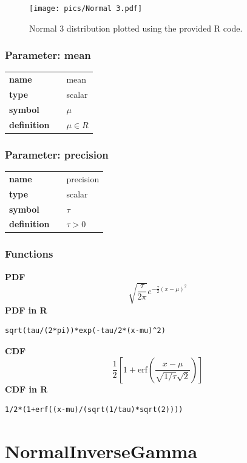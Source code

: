\documentclass{article}
\begin{document}
\begin{figure}[ht!]
\centering
  \texttt{[image: pics/Normal 3.pdf]}
 \caption{Normal 3 distribution plotted using the provided R code.}
 \label{fig:Normal 3}
\end{figure}

\subsubsection*{Parameter: mean}

\noindent\begin{tabular}{p{2cm}cl}
\textbf{name} & & mean \\
\textbf{type} & & scalar \\
\textbf{symbol} & & $\mu$  \\
\textbf{definition} & & $\mu \in R$
\end{tabular}
\subsubsection*{Parameter: precision}

\noindent\begin{tabular}{p{2cm}cl}
\textbf{name} & & precision \\
\textbf{type} & & scalar \\
\textbf{symbol} & & $\tau$  \\
\textbf{definition} & & $\tau>0$
\end{tabular}
\subsubsection*{Functions}

\smallskip \noindent \hspace{.2cm} \textbf{PDF} 
\begin{equation*}\sqrt{\frac{\tau}{2 \pi}} e^{-\frac{\tau}{2}(x-\mu)^2}\end{equation*}
\smallskip \noindent \hspace{.2cm} \textbf{PDF in R}  
\begin{verbatim}sqrt(tau/(2*pi))*exp(-tau/2*(x-mu)^2)\end{verbatim}
\smallskip \noindent \hspace{.2cm} \textbf{CDF} 
\begin{equation*}\frac12\left[1 + \text{erf}\left( \frac{x-\mu}{\sqrt{1/\tau}\sqrt{2}}\right)\right]\end{equation*}
\smallskip \noindent \hspace{.2cm} \textbf{CDF in R} 
\begin{verbatim}1/2*(1+erf((x-mu)/(sqrt(1/tau)*sqrt(2)))) \end{verbatim}
\smallskip\section*{NormalInverseGamma} 
\end{document}
